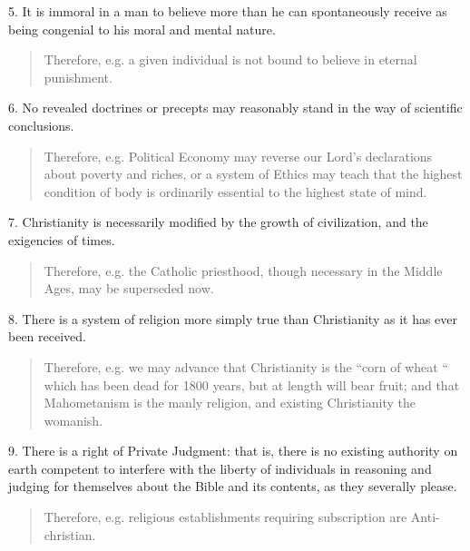 5. It is immoral in a man to believe more than he can spontaneously
receive as being congenial to his moral and mental nature.

\begin{quote}

Therefore, e.g. a given individual is not bound to believe in
eternal punishment.
\end{quote}

6. No revealed doctrines or precepts may reasonably stand in the way
of scientific conclusions.

\begin{quote}

Therefore, e.g. Political Economy may reverse our Lord's
declarations about poverty and riches, or a system of Ethics may
teach that the highest condition of body is ordinarily essential to
the highest state of mind.

\end{quote}

7. Christianity is necessarily modified by the growth of
civilization, and the exigencies of times.

\begin{quote}

Therefore, e.g. the Catholic priesthood, though necessary in the
Middle Ages, may be superseded now.

\end{quote}

8. There is a system of religion more simply true than Christianity
as it has ever been received.

\begin{quote}

Therefore, e.g. we may advance that Christianity is the
``corn of wheat `` which has been dead for 1800 years, but
at length will bear fruit; and that Mahometanism is the manly
religion, and existing Christianity the womanish.

\end{quote}

9. There is a right of Private Judgment: that is, there is no
existing authority on earth competent to interfere with the liberty of
individuals in reasoning and judging for themselves about the Bible and
its contents, as they severally please.

\begin{quote}

Therefore, e.g. religious establishments requiring subscription
are Anti-christian.

\end{quote}

